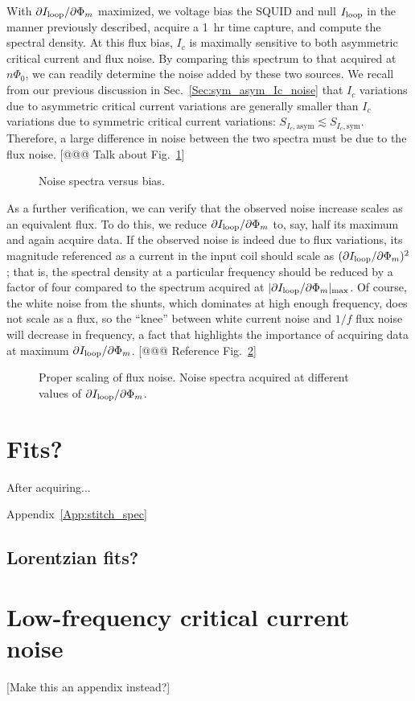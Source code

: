 With $\partial I_\text{loop}/\partial\Phi_m$ maximized, we voltage bias the SQUID and null $I_\text{loop}$ in the manner previously described, acquire a 1~hr time capture, and compute the spectral density. At this flux bias, $I_c$ is maximally sensitive to both asymmetric critical current and flux noise.
By comparing this spectrum to that acquired at $n\Phi_0$, we can readily determine the noise added by these two sources. We recall from our previous discussion in Sec.~\ref{Sec:sym_asym_Ic_noise} that $I_c$ variations due to asymmetric critical current variations are generally smaller than $I_c$ variations due to symmetric critical current variations: $S_{I_c,\text{asym}} \lesssim S_{I_c,\text{sym}}$. Therefore, a large difference in noise between the two spectra must be due to the flux noise. [@@@ Talk about Fig.~\ref{Fig:spectra_vs_bias}]

\begin{figure}
\caption[Blah]{Noise spectra versus bias.}
\label{Fig:spectra_vs_bias}
\end{figure}

As a further verification, we can verify that the observed noise increase scales as an equivalent flux. To do this, we reduce $\partial I_\text{loop}/\partial\Phi_m$ to, say, half its maximum and again acquire data. If the observed noise is indeed due to flux variations, its magnitude referenced as a current in the input coil should scale as $(\partial I_\text{loop}/\partial\Phi_m)^2$; that is, the spectral density at a particular frequency should be reduced by a factor of four compared to the spectrum acquired at $|\partial I_\text{loop}/\partial\Phi_m|_\text{max}$. Of course, the white noise from the shunts, which dominates at high enough frequency, does not scale as a flux, so the ``knee'' between white current noise and $1/f$ flux noise will decrease in frequency, a fact that highlights the importance of acquiring data at maximum $\partial I_\text{loop}/\partial\Phi_m$. [@@@ Reference Fig.~\ref{Fig:spectra_vs_flux_bias}]

\begin{figure}
\caption[Blah]{Proper scaling of flux noise. Noise spectra acquired at different values of $\partial I_\text{loop}/\partial\Phi_m$.}
\label{Fig:spectra_vs_flux_bias}
\end{figure}

\section{Fits?}

After acquiring...

Appendix~\ref{App:stitch_spec}




\subsection{Lorentzian fits?}

\section{Low-frequency critical current noise}

[Make this an appendix instead?]








